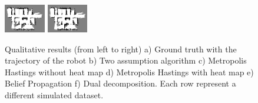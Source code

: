 \documentclass[letterpaper, 10 pt, conference]{ieeeconf} %
\begin{document}
\begin{figure}
  \includegraphics[width=0.16\textwidth, trim=0 0 0 3px, clip]{../../Data/hospital_section_player/run_belief_propagation.png}%
  \includegraphics[width=0.16\textwidth, trim=0 0 0 3px, clip]{../../Data/hospital_section_player/dualdecomposition.png}%
  \caption{Qualitative results (from left to right) a) Ground truth with the trajectory of the robot b) Two assumption algorithm c) Metropolis Hastings without heat map d) Metropolis Hastings with heat map e) Belief Propagation  f) Dual decomposition. Each row represent a different simulated dataset.}
  \label{fig:convergence-comparison-visuals}
\end{figure}
\end{document}
